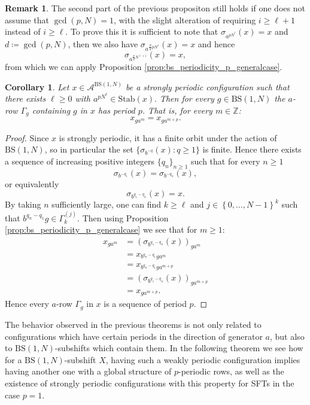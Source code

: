 \documentclass{aims}
\newcommand{\BS}[1][N]{\mathrm{BS}(1,#1)}
\newtheorem{corollary}{Corollary}
\theoremstyle{definition}
\newtheorem{remark}{Remark}
\begin{document}
\begin{remark} The second part of the previous propositon still holds if one does not assume that $\gcd(p,N)=1$, with the slight alteration of requiring $i\ge \ell+1$ instead of $i\ge \ell$. To prove this it is sufficient to note that $\sigma_{a^{pN^\ell}}(x)=x$ and $d\coloneqq \gcd(p,N)$, then we also have $\sigma_{a^{\frac{N}{d}pN^\ell}}(x)=x$ and hence 
	$$
	\sigma_{a^{\frac{p}{d}N^{\ell+1}}}(x)=x,
	$$
	from which we can apply Proposition \ref{prop:bs_periodicity_p_generalcase}.
\end{remark}

\begin{corollary} Let $x\in \mathcal{A}^{\BS}$ be a strongly periodic configuration such that there exists $\ell\ge 0$ with $a^{pN^{\ell}}\in \mathrm{Stab}(x).$ Then for every $g\in \BS$ the $a$-row $\Gamma_g$ containing $g$ in $x$ has period $p$. That is, for every $m\in \mathbb{Z}$:
	$$
	x_{ga^{m}}=x_{ga^{m+p}}.
	$$
\end{corollary}
\begin{proof}
	Since $x$ is strongly periodic, it has a finite orbit under the action of $\BS$, so in particular the set $\{ \sigma_{b^{-q}}(x): q\ge 1 \}$ is finite. Hence there exists a sequence of increasing positive integers $\{q_n\}_{n\ge 1}$ such that for every $n\ge1$
	$$
	\sigma_{b^{-q_1}}(x)=\sigma_{b^{-q_n}}(x),
	$$
	or equivalently
	$$
	\sigma_{b^{q_1-q_n}}(x)=x.
	$$
	By taking $n$ sufficiently large, one can find $k\ge \ell $ and $j\in\left\{0,\ldots,N-1\right\}^k$ such that $b^{q_n-q_1}g\in \Gamma_{k}^{(j)}$. Then using Proposition \ref{prop:bs_periodicity_p_generalcase} we see that for $m\ge 1:$
	\begin{equation*}
	\begin{aligned}
	x_{ga^{m}}&=(\sigma_{b^{q_1-q_n}}(x))_{ga^{m}} \\
	&=x_{b^{q_n-q_1}ga^{m}}\\
	&=x_{b^{q_n-q_1}ga^{m+p}} \\
	&=(\sigma_{b^{q_1-q_n}}(x))_{ga^{m+p}}\\
	&=x_{ga^{m+p}}.
	\end{aligned}
	\end{equation*}
	Hence every $a$-row $\Gamma_g$ in $x$ is a sequence of period $p$.
\end{proof}
The behavior observed in the previous theorems is not only related to configurations which have certain periods in the direction of generator $a$, but also to $\BS$-subshifts which contain them. In the following theorem we see how for a $\BS$-subshift $X$, having such a weakly periodic configuration implies having another one with a global structure of $p$-periodic rows, as well as the existence of strongly periodic configurations with this property for SFTs in the case $p=1$.
\end{document}
